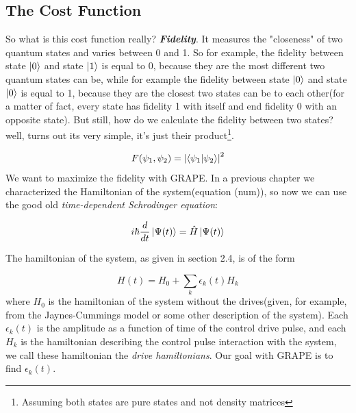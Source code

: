 \documentclass[english, a4paper, 12pt, twoside]{article}
\numberwithin{equation}{section} %
\begin{document}
\subsection{The Cost Function}
So what is this cost function really? \textit{\textbf{Fidelity}}. It measures the "closeness" of two quantum states and varies between 0 and 1. So for example, the fidelity between state $\ket{0}$ and state $\ket{1}$ is equal to 0, because they are the most different two quantum states can be, while for example the fidelity between state $\ket{0}$ and state $\ket{0}$ is equal to 1, because they are the closest two states can be to each other(for a matter of fact, every state has fidelity 1 with itself and end fidelity 0 with an opposite state). But still, how do we calculate the fidelity between two states? well, turns out its very simple, it's just their product\footnote{Assuming both states are pure states and not density matrices}.

\begin{equation} \label{def:fid}
F(\psi_1, \psi_2) = \abs{\braket{\psi_1}{\psi_2}}^2
\end{equation}
We want to maximize the fidelity with GRAPE.
In a previous chapter we characterized the Hamiltonian of the system(equation (num)), so now we can use the good old \textit{time-dependent Schrodinger equation}:

\begin{equation}
i\hbar\frac{d}{dt}\ket{\Psi(t)} = \hat{H}\ket{\Psi(t)}
\end{equation}

The hamiltonian of the system, as given in section 2.4, is of the  form %

\begin{equation} \label{eq:hamiltonianl_form}
H(t) = H_0 + \sum_k{\epsilon_k(t) H_k} %
\end{equation}
where $H_0$ is the hamiltonian of the system without the drives(given, for example, from the Jaynes-Cummings model or some other description of the system). Each $\epsilon_k(t)$ is the amplitude as a function of time of the control drive pulse, and each $H_k$ is the hamiltonian describing the control pulse interaction with the system, we call these hamiltonian the \textit{drive hamiltonians}. Our goal with GRAPE is to find $\epsilon_k(t)$.
\end{document}
